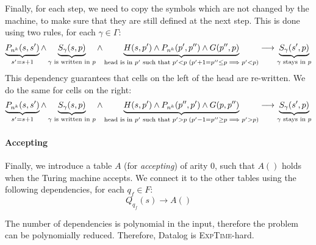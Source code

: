 \documentclass{../../cs-classes/cs-classes}
\begin{document}
\begin{exercise}
    Finally, for each step, we need to copy the symbols which are not changed by the machine, to make sure that they are still defined at the next step. This is done using two rules, for each $\gamma\in\Gamma$:
    \begin{equation*}
        \underbrace{P_{n^k}(s, s')}_{s' = s+1} \land \underbrace{S_\gamma(s, p)}_{\gamma \textnormal{ is written in } p} \land \underbrace{H(s, p') \land P_{n^k}(p', p'') \land G(p'', p)}_{\textnormal{head is in }p' \textnormal{ such that }p'<p \; (p'+1=p''\leq p \implies p'<p)} \longrightarrow \underbrace{S_\gamma(s', p)}_{\gamma \textnormal{ stays in }p}
    \end{equation*}
    This dependency guarantees that cells on the left of the head are re-written. We do the same for cells on the right:
    \begin{equation*}
        \underbrace{P_{n^k}(s, s')}_{s' = s+1} \land \underbrace{S_\gamma(s, p)}_{\gamma \textnormal{ is written in } p} \land \underbrace{H(s, p') \land P_{n^k}(p'', p') \land G(p, p'')}_{\textnormal{head is in }p' \textnormal{ such that }p'>p \; (p'-1=p''\geq p \implies p'>p)} \longrightarrow \underbrace{S_\gamma(s', p)}_{\gamma \textnormal{ stays in }p}
    \end{equation*}

    \paragraph*{Accepting}
    Finally, we introduce a table $A$ (for \emph{accepting}) of arity 0, such that $A()$ holds when the Turing machine accepts. We connect it to the other tables using the following dependencies, for each $q_f\in F$:
    \begin{equation*}
        Q_{q_f}(s) \rightarrow A()
    \end{equation*}

    The number of dependencies is polynomial in the input, therefore the problem can be polynomially reduced. Therefore, Datalog is \textsc{ExpTime}-hard.
\end{exercise}
\end{document}
